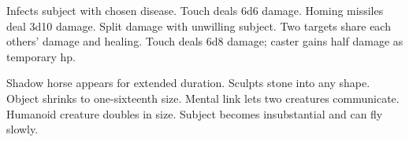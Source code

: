\begin{swspelllist}
   Infects subject with chosen disease.
   Touch deals 6d6 damage.
   Homing missiles deal 3d10 damage.
   Split damage with unwilling subject.
   Two targets share each others' damage and healing.
   Touch deals 6d8 damage; caster gains half damage as temporary hp.

   Shadow horse appears for extended duration.
   Sculpts stone into any shape.
   Object shrinks to one-sixteenth size.
   Mental link lets two creatures communicate.
   Humanoid creature doubles in size.
   Subject becomes insubstantial and can fly slowly.
\end{swspelllist}

